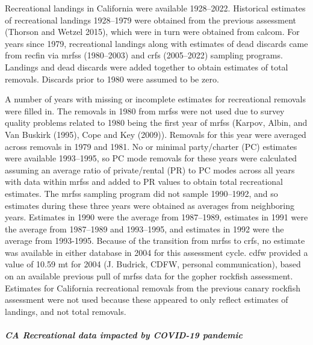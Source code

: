 \documentclass[11pt,
  english,
  letterpaper,
]{article}
\begin{document}
Recreational landings in California were available 1928--2022. Historical estimates of recreational landings 1928--1979 were obtained from the previous assessment (Thorson and Wetzel 2015), which were in turn were obtained from \gls{calcom}. For years since 1979, recreational landings along with estimates of dead discards came from \gls{recfin} via \gls{mrfss} (1980--2003) and \gls{crfs} (2005--2022) sampling programs. Landings and dead discards were added together to obtain estimates of total removals. Discards prior to 1980 were assumed to be zero.

A number of years with missing or incomplete estimates for recreational removals were filled in. The removals in 1980 from \gls{mrfss} were not used due to survey quality problems related to 1980 being the first year of \gls{mrfss} (Karpov, Albin, and Van Buskirk (1995), Cope and Key (2009)). Removals for this year were averaged across removals in 1979 and 1981. No or minimal party/charter (PC) estimates were available 1993--1995, so PC mode removals for these years were calculated assuming an average ratio of private/rental (PR) to PC modes across all years with data within \gls{mrfss} and added to PR values to obtain total recreational estimates. The \gls{mrfss} sampling program did not sample 1990--1992, and so estimates during these three years were obtained as averages from neighboring years. Estimates in 1990 were the average from 1987--1989, estimates in 1991 were the average from 1987--1989 and 1993--1995, and estimates in 1992 were the average from 1993-1995. Because of the transition from \gls{mrfss} to \gls{crfs}, no estimate was available in either database in 2004 for this assessment cycle. \Gls{cdfw} provided a value of 10.59 mt for 2004 (J. Budrick, CDFW, personal communication), based on an available previous pull of \gls{mrfss} data for the gopher rockfish assessment. Estimates for California recreational removals from the previous canary rockfish assessment were not used because these appeared to only reflect estimates of landings, and not total removals.

\hypertarget{ca-recreational-data-impacted-by-covid-19-pandemic}{%
\subparagraph{CA Recreational data impacted by COVID-19 pandemic}\label{ca-recreational-data-impacted-by-covid-19-pandemic}}
\end{document}
